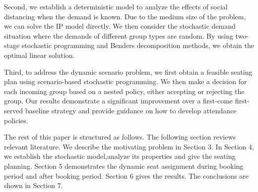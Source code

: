 Second, we establish a deterministic model to analyze the effects of social distancing when the demand is known. Due to the medium size of the problem, we can solve the IP model directly. We then consider the stochastic demand situation where the demands of different group types are random. By using two-stage stochastic programming and Benders decomposition methods, we obtain the optimal linear solution.

Third, to address the dynamic scenario problem, we first obtain a feasible seating plan using scenario-based stochastic programming. We then make a decision for each incoming group based on a nested policy, either accepting or rejecting the group. Our results demonstrate a significant improvement over a first-come first-served baseline strategy and provide guidance on how to develop attendance policies.






The rest of this paper is structured as follows. The following section reviews relevant literature. We describe the motivating problem in Section 3. In Section 4, we establish the stochastic model,analyze its properties and give the seating planning. Section 5 demonstrates the dynamic seat assignment during booking period and after booking period. Section 6 gives the results. The conclusions are shown in Section 7.


\newpage
